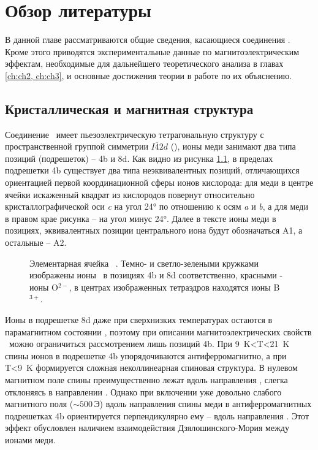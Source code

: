 \chapter{Обзор литературы}\label{ch:ch1}

В данной главе рассматриваются общие сведения, касающиеся соединения \cbo. Кроме этого приводятся экспериментальные данные по магнитоэлектрическим эффектам, необходимые для дальнейшего теоретического анализа в главах \cref{ch:ch2, ch:ch3}, и основные достижения теории в работе по их объяснению.

\section{Кристаллическая и магнитная структура \cbo}\label{sec:ch1/sec1}

Соединение \cbo\ имеет пьезоэлектрическую тетрагональную структуру с пространственной группой симметрии \(I\overline{4}2d\) (), ионы меди занимают два типа позиций (подрешеток) – 4b и 8d. Как видно из рисунка \cref{fig:unit-cell}, в пределах подрешетки 4b существует два типа неэквивалентных позиций, отличающихся ориентацией первой координационной сферы ионов кислорода: для меди в центре ячейки искаженный квадрат из кислородов повернут относительно кристаллографической оси \emph{c} на угол \ang{24} по отношению к осям \emph{a} и \emph{b}, а для меди в правом крае рисунка -- на угол минус \ang{24}. Далее в тексте ионы меди в позициях, эквивалентных позиции центрального иона будут обозначаться A1, а остальные -- A2.

\begin{figure}[ht]
	\caption{Элементарная ячейка \cbo\ \cite{Martinez1971}. Темно- и светло-зелеными кружками изображены ионы \cu\ в позициях 4b и 8d соответственно, красными - ионы O\(^{2-}\), в центрах изображенных тетраэдров находятся ионы B\(^{3+}\). }
	\label{fig:unit-cell}
\end{figure}

Ионы в подрешетке 8d даже при сверхнизких температурах остаются в парамагнитном состоянии \cite{Boehm2003}, поэтому при описании магнитоэлектрических свойств \cbo\ можно ограничиться рассмотрением лишь позиций 4b. При \SI{9}{\kelvin}<T<\SI{21}{\kelvin} спины ионов в подрешетке 4b  упорядочиваются антиферромагнитно, а при T<\SI{9}{\kelvin} формируется сложная неколлинеарная спиновая структура.  В нулевом магнитном поле спины преимущественно лежат вдоль направления , слегка отклоняясь в направлении  \cite{Boehm2003}. Однако при включении уже довольно слабого магнитного поля (\({\sim}500\,\)Э) вдоль направления  спины меди в антиферромагнитных подрешетках 4b ориентируется перпендикулярно ему – вдоль направления  \cite{Toyoda2019}. Этот эффект обусловлен наличием взаимодействия Дзялошинского-Мория между ионами меди.

